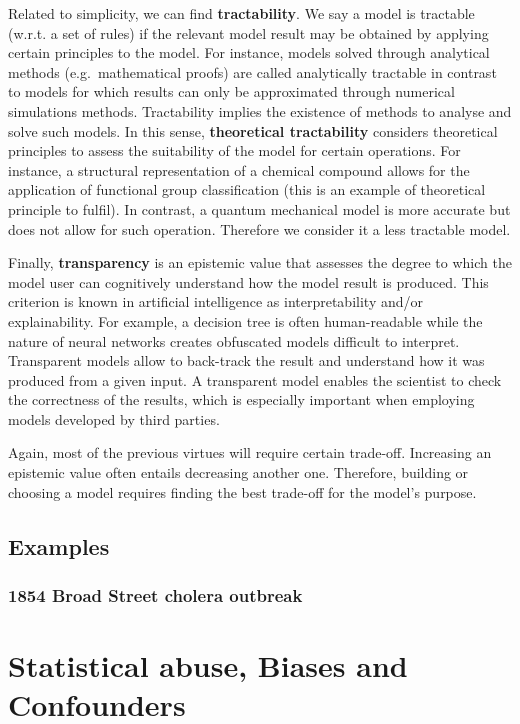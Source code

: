 \documentclass[
]{book}
\begin{document}
Related to simplicity, we can find \textbf{tractability}. We say a model is tractable (w.r.t. a set of rules) if the relevant model result may be obtained by applying certain principles to the model. For instance, models solved through analytical methods (e.g.~mathematical proofs) are called analytically tractable in contrast to models for which results can only be approximated through numerical simulations methods. Tractability implies the existence of methods to analyse and solve such models. In this sense, \textbf{theoretical tractability} considers theoretical principles to assess the suitability of the model for certain operations. For instance, a structural representation of a chemical compound allows for the application of functional group classification (this is an example of theoretical principle to fulfil). In contrast, a quantum mechanical model is more accurate but does not allow for such operation. Therefore we consider it a less tractable model.

Finally, \textbf{transparency} is an epistemic value that assesses the degree to which the model user can cognitively understand how the model result is produced. This criterion is known in artificial intelligence as interpretability and/or explainability. For example, a decision tree is often human-readable while the nature of neural networks creates obfuscated models difficult to interpret. Transparent models allow to back-track the result and understand how it was produced from a given input. A transparent model enables the scientist to check the correctness of the results, which is especially important when employing models developed by third parties.

Again, most of the previous virtues will require certain trade-off. Increasing an epistemic value often entails decreasing another one. Therefore, building or choosing a model requires finding the best trade-off for the model's purpose.

\hypertarget{examples-2}{%
\section{Examples}\label{examples-2}}

\hypertarget{john-snow}{%
\subsection{1854 Broad Street cholera outbreak}\label{john-snow}}

\hypertarget{stats-abuse}{%
\chapter{Statistical abuse, Biases and Confounders}\label{stats-abuse}}
\end{document}
